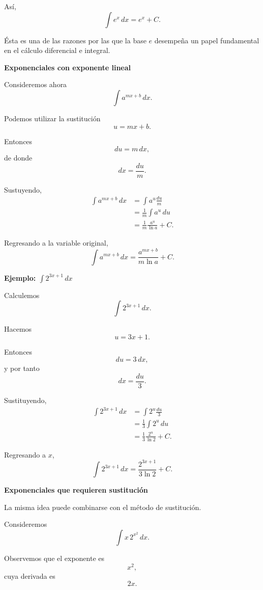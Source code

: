 \documentclass[12pt]{article}
\theoremstyle{definition}
\theoremstyle{remark}
\begin{document}
Así,
\[
\boxed{
\int e^x\,dx=e^x+C
}.
\]

Ésta es una de las razones por las que la base \(e\) desempeña un papel
fundamental en el cálculo diferencial e integral.

\textbf{Exponenciales con exponente lineal}

Consideremos ahora
\[
\int a^{mx+b}\,dx.
\]

Podemos utilizar la sustitución
\[
u=mx+b.
\]

Entonces
\[
du=m\,dx,
\]
de donde
\[
dx=\frac{du}{m}.
\]

Sustuyendo,
\[
\begin{aligned}
\int a^{mx+b}\,dx
&=
\int a^u\frac{du}{m}
\\[0.3cm]
&=
\frac{1}{m}\int a^u\,du
\\[0.3cm]
&=
\frac{1}{m}
\frac{a^u}{\ln a}+C.
\end{aligned}
\]

Regresando a la variable original,
\[
\boxed{
\int a^{mx+b}\,dx
=
\frac{a^{mx+b}}{m\ln a}+C
}.
\]

\textbf{Ejemplo: \(\int 2^{3x+1}\,dx\)}

Calculemos
\[
\int 2^{3x+1}\,dx.
\]

Hacemos
\[
u=3x+1.
\]

Entonces
\[
du=3\,dx,
\]
y por tanto
\[
dx=\frac{du}{3}.
\]

Sustituyendo,
\[
\begin{aligned}
\int 2^{3x+1}\,dx
&=
\int 2^u\frac{du}{3}
\\[0.3cm]
&=
\frac{1}{3}\int 2^u\,du
\\[0.3cm]
&=
\frac{1}{3}
\frac{2^u}{\ln 2}+C.
\end{aligned}
\]

Regresando a \(x\),
\[
\boxed{
\int 2^{3x+1}\,dx
=
\frac{2^{3x+1}}{3\ln 2}+C
}.
\]

\textbf{Exponenciales que requieren sustitución}

La misma idea puede combinarse con el método de sustitución.

Consideremos
\[
\int x\,2^{x^2}\,dx.
\]

Observemos que el exponente es
\[
x^2,
\]
cuya derivada es
\[
2x.
\]
\end{document}
